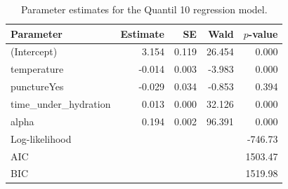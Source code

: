\begin{table}[ht]
\centering
\caption{Parameter estimates for the Quantil 10 regression model.}
\label{tab:quantil_10}
\begin{tabular}{lrrrr}
\toprule
Parameter & Estimate & SE & Wald & $p$-value\\
\midrule
(Intercept) & 3.154 & 0.119 & 26.454 & 0.000\\
temperature & -0.014 & 0.003 & -3.983 & 0.000\\
punctureYes & -0.029 & 0.034 & -0.853 & 0.394\\
time_under_hydration & 0.013 & 0.000 & 32.126 & 0.000\\
alpha & 0.194 & 0.002 & 96.391 & 0.000\\
\midrule
Log-likelihood & \multicolumn{4}{r}{-746.73}\\
AIC & \multicolumn{4}{r}{1503.47}\\
BIC & \multicolumn{4}{r}{1519.98}\\
\bottomrule
\end{tabular}
\end{table}
